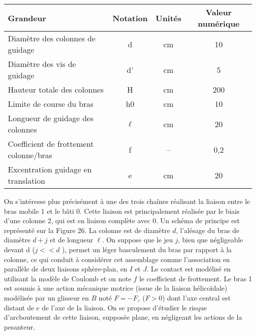 \documentclass[10pt,fleqn]{article} %
\begin{document}

\vspace{5cm}
\pagestyle{fancy}
\thispagestyle{plain}


\def\columnseprulecolor{\color{ocre}}
\setlength{\columnseprule}{0.4pt} 

\begin{multicols}{2}


\begin{center}
\begin{tabular}{|p{4cm}|c|c|c|}
\hline
Grandeur & Notation & Unités & Valeur numérique \\ \hline
Diamètre des colonnes  de guidage & d & cm & 10 \\ \hline
Diamètre des vis de guidage & d' & cm & 5 \\ \hline
Hauteur totale des colonnes & H & cm & 200 \\ \hline
Limite de course du bras & h0 & cm & 10 \\ \hline
Longueur de guidage des colonnes & $\ell$  & cm & 20 \\ \hline
Coefficient de frottement colonne/bras & f & -- & 0,2 \\ \hline
Excentration guidage en translation & e & cm & 20 \\ \hline
\end{tabular}
\end{center}

On s’intéresse plus précisément à une des trois chaînes réalisant la liaison entre le bras mobile 1 et le bâti
0. 
Cette liaison est principalement réalisée par le biais d’une colonne 2, qui est en liaison complète avec 0. Un schéma de principe est représenté sur la Figure 26. La colonne est de diamètre $d$, l’alésage du bras de diamètre
$d + j$ et  de longueur $\ell$. On suppose que le jeu $j$, bien que négligeable devant d ($j  << d$ ), permet un léger
basculement du bras par rapport à la colonne, ce qui conduit à considérer cet assemblage comme l’association en parallèle de deux liaisons sphère-plan, en $I$ et $J$. Le contact est modélisé en utilisant la modèle de Coulomb et on note $f$  le coefficient  de frottement. Le bras 1 est soumis à une action mécanique motrice (issue de la
liaison hélicoïdale) modélisée par un glisseur en $B$ noté $F = −F_z$ ($F > 0$) dont l’axe central est distant de $e$
de l’axe de la liaison. On se propose  d’étudier le risque d’arcboutement  de cette liaison, supposée plane, en négligeant les actions de la pesanteur.


\end{multicols}
 
\end{document}
